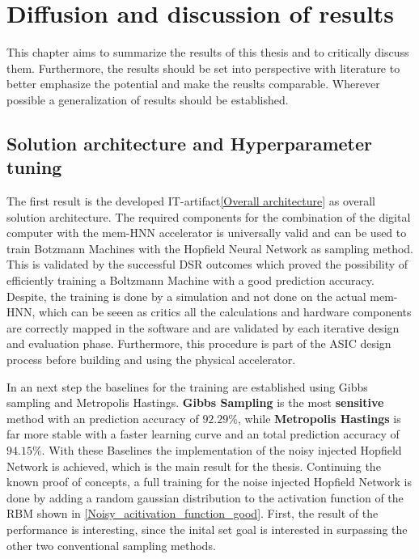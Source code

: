 \chapter{Diffusion and discussion of results}

This chapter aims to summarize the results of this thesis and to critically discuss them.
Furthermore, the results should be set into perspective with literature to better emphasize the potential
and make the reuslts comparable. 
Wherever possible a generalization of results should be established.

\section{Solution architecture and Hyperparameter tuning}

The first result is the developed \ac{IT}-artifact\ref{Overall architecture} as overall solution architecture. 
The required components for the combination of the digital computer with the \ac{mem-HNN} accelerator 
is universally valid and can be used to train Botzmann Machines with the Hopfield Neural Network as sampling method. 
This is validated by the successful \ac{DSR} outcomes which proved the possibility of efficiently 
training a Boltzmann Machine with a good prediction accuracy.
Despite, the training is done by a simulation and not done on the actual \ac{mem-HNN}, which can be seeen as critics 
all the calculations and hardware components are correctly mapped in the software and are validated by each iterative design and evaluation phase.
Furthermore, this procedure is part of the \ac{ASIC} design process before building and using the physical accelerator.

In an next step the baselines for the training are established using Gibbs sampling and Metropolis Hastings.
\textbf{Gibbs Sampling} is the most \textbf{sensitive} method with an prediction accuracy of \(\mathbf{92.29\%}\), while
\textbf{Metropolis Hastings} is far more stable with a faster learning curve and an total prediction accuracy of \(\mathbf{94.15\%}\).
With these Baselines the implementation of the noisy injected Hopfield Network is achieved, which is the main result for the thesis. 
Continuing the known proof of concepts, a full training for the noise injected Hopfield Network is done by adding a random gaussian distribution 
to the activation function of the \ac{RBM} shown in \ref{Noisy_acitivation_function_good}. 
First, the result of the performance is interesting, since the inital set goal is interested in surpassing the other two conventional sampling methods.

